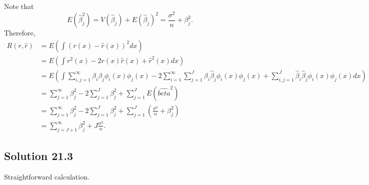 Note that
\begin{equation*}
    E(\hat{\beta}_j^2) = V(\hat{\beta}_j) + E(\hat{\beta}_j)^2 = \frac{\sigma^2}{n} + \beta_j^2.
\end{equation*}
Therefore,
\begin{equation*}
    \begin{split}
        R(r, \hat{r}) &= E\left(\int (r(x) - \hat{r}(x))^2 dx\right) \\
            &= E\left(\int r^2(x) - 2r(x)\hat{r}(x) + \hat{r}^2(x) dx\right) \\
            &= E\left(\int \sum_{i, j = 1}^{\infty} \beta_i \beta_j \phi_i(x) \phi_j(x) - 2 \sum_{i = 1}^{\infty} \sum_{j = 1}^J \beta_i \hat{\beta}_j \phi_i(x) \phi_j(x) + \sum_{i, j = 1}^J \hat{\beta}_i \hat{\beta}_j \phi_i(x) \phi_j(x) dx\right) \\
            &= \sum_{j = 1}^{\infty} \beta_j^2 - 2\sum_{j = 1}^J \beta_j^2 + \sum_{j = 1}^J E(\hat{beta}^2) \\
            &= \sum_{j = 1}^{\infty} \beta_j^2 - 2\sum_{j = 1}^J \beta_j^2 + \sum_{j = 1}^J (\frac{\sigma^2}{n} + \beta_j^2) \\
            &= \sum_{j = J + 1}^{\infty} \beta_j^2 + J \frac{\sigma^2}{n}.
    \end{split}
\end{equation*}


\subsection*{Solution 21.3}

Straightforward calculation.
